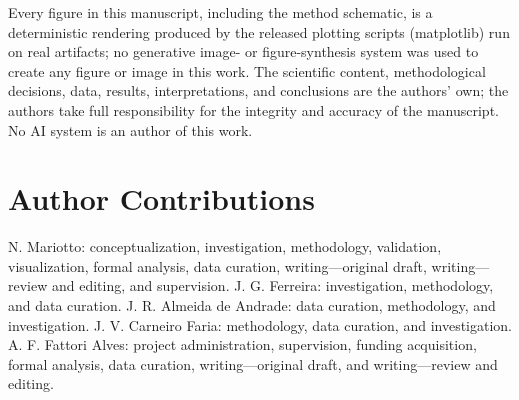 \documentclass{ieeeaccess}
\begin{document}
Every figure in this manuscript, including the method schematic, is a deterministic rendering
produced by the released plotting scripts (matplotlib) run on real artifacts; no generative
image- or figure-synthesis system was used to create any figure or image in this work. The
scientific content, methodological decisions, data, results, interpretations, and conclusions are
the authors' own; the authors take full responsibility for the integrity and accuracy of the
manuscript. No AI system is an author of this work.

\section*{Author Contributions}
N. Mariotto: conceptualization, investigation, methodology, validation, visualization, formal analysis, data curation, writing---original draft, writing---review and editing, and supervision. J. G. Ferreira: investigation, methodology, and data curation. J. R. Almeida de Andrade: data curation, methodology, and investigation. J. V. Carneiro Faria: methodology, data curation, and investigation. A. F. Fattori Alves: project administration, supervision, funding acquisition, formal analysis, data curation, writing---original draft, and writing---review and editing.
\end{document}
